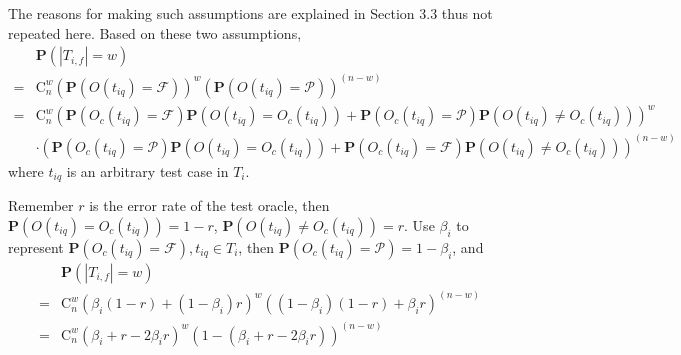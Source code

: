 The reasons for making such assumptions are explained in Section 3.3 thus not repeated here. Based on these two assumptions,
\begin{equation*}
\begin{aligned}
& \mathbf{P}(|T_{i,f}| = w) \\
= & \mathrm{C}_n^w{(\mathbf{P}(O(t_{iq}) = \mathcal{F}))}^w {(\mathbf{P}(O(t_{iq}) = \mathcal{P}))}^{(n-w)} \\
= & \mathrm{C}_n^w {(\mathbf{P}(O_c(t_{iq}) = \mathcal{F})\mathbf{P}(O(t_{iq}) = O_c(t_{iq}))+ \mathbf{P}(O_c(t_{iq}) = \mathcal{P})\mathbf{P}(O(t_{iq}) \neq O_c(t_{iq})))}^w \\
& \cdot {(\mathbf{P}(O_c(t_{iq}) = \mathcal{P})\mathbf{P}(O(t_{iq}) = O_c(t_{iq})) + \mathbf{P}(O_c(t_{iq}) = \mathcal{F})\mathbf{P}(O(t_{iq}) \neq O_c(t_{iq})))}^{(n - w)}
\end{aligned}
\end{equation*}
where $t_{iq}$ is an arbitrary test case in $T_i$.

Remember $r$ is the error rate of the test oracle, then $\mathbf{P}(O(t_{iq}) = O_c(t_{iq})) = 1 - r$, $\mathbf{P}(O(t_{iq}) \neq O_c(t_{iq})) = r$. Use $\beta_i$ to represent $\mathbf{P}(O_c(t_{iq}) = \mathcal{F}), t_{iq}\in T_i$, then $\mathbf{P}(O_c(t_{iq}) = \mathcal{P})= 1 - \beta_i$, and
\begin{equation}
\label{equ: single w}
\begin{aligned}
& \mathbf{P}(|T_{i,f}| = w) \\
= & \mathrm{C}_n^w{(\beta_i(1 - r) + (1-\beta_i)r)}^w{((1-\beta_i)(1 - r) + \beta_i r)}^{(n - w)} \\
= & \mathrm{C}_n^w{(\beta_i + r - 2\beta_i r)^w (1-(\beta_i + r - 2\beta_i r))^{(n-w)}}
\end{aligned}
\end{equation}

